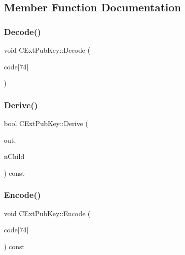 \subsection{Member Function Documentation}
\mbox{\label{struct_c_ext_pub_key_aa3ca44410ecfa765962d3b97aef61ab5}} 
\subsubsection{\texorpdfstring{Decode()}{Decode()}}
{\footnotesize\ttfamily void C\+Ext\+Pub\+Key\+::\+Decode (\begin{DoxyParamCaption}\item[{const unsigned char}]{code\mbox{[}74\mbox{]} }\end{DoxyParamCaption})}

\mbox{\label{struct_c_ext_pub_key_a2dae8fcc00b9617589dd0b1444f95ec8}} 
\subsubsection{\texorpdfstring{Derive()}{Derive()}}
{\footnotesize\ttfamily bool C\+Ext\+Pub\+Key\+::\+Derive (\begin{DoxyParamCaption}\item[{\mbox{\hyperlink{struct_c_ext_pub_key}{C\+Ext\+Pub\+Key}} \&}]{out,  }\item[{unsigned int}]{n\+Child }\end{DoxyParamCaption}) const}

\mbox{\label{struct_c_ext_pub_key_a3a2ca2ede05e4b709e0a9a1bcee4de1e}} 
\subsubsection{\texorpdfstring{Encode()}{Encode()}}
{\footnotesize\ttfamily void C\+Ext\+Pub\+Key\+::\+Encode (\begin{DoxyParamCaption}\item[{unsigned char}]{code\mbox{[}74\mbox{]} }\end{DoxyParamCaption}) const}



